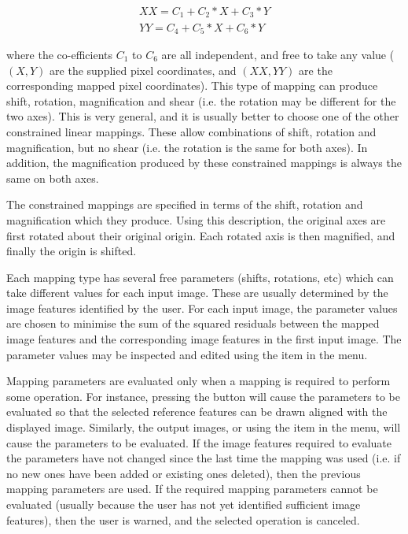 \begin{description}
\begin{eqnarray*}
XX = C_{1} + C_{2}*X + C_{3}*Y \\
YY = C_{4} + C_{5}*X + C_{6}*Y 
\end{eqnarray*}

where the co-efficients $C_{1}$ to $C_{6}$ are all independent, and free
to take any value ($(X,Y)$ are the supplied pixel coordinates, and
$(XX,YY)$ are the corresponding mapped pixel coordinates). This type of
mapping can produce shift, rotation, magnification and shear (i.e. the 
rotation may be different for the two axes). This is very general,
and it is usually better to choose one of the other constrained linear 
mappings. These allow
combinations of shift, rotation and magnification, but no shear (i.e. the
rotation is the same for both axes). In addition, the magnification
produced by these constrained mappings is always the same on both axes.

The constrained mappings are specified in terms of the shift, rotation and
magnification which they produce. Using this description, the original
axes are first rotated about their original origin. Each rotated axis is 
then magnified, and finally the origin is shifted.

Each mapping type has several free parameters (shifts, rotations, etc)
which can take different values for each input image. These are usually
determined by the image features identified by the user. For each input
image, the parameter values are chosen to minimise the sum of the squared
residuals between the mapped image features and the corresponding image
features in the first input image. The parameter values may be inspected
and edited using the  item
in the  menu.

Mapping parameters are evaluated only when a mapping is required to
perform some operation. For instance, pressing the  button will cause the parameters to be
evaluated so that the selected reference features can be drawn
aligned with the displayed image. Similarly,  
the output images, or using the 
item in the  menu, will cause the
parameters to be evaluated. If the image features required to evaluate
the parameters have not changed since the last time the mapping was used
(i.e. if no new ones have been added or existing ones deleted), then the
previous mapping parameters are used. If the required mapping parameters 
cannot be evaluated (usually because the user has not yet identified
sufficient image features), then the user is warned, and the selected
operation is canceled.


\end{description}
